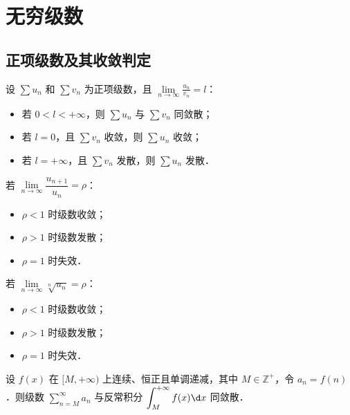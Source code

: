 \documentclass[12pt, a4paper, oneside, UTF8]{ctexbook}
\begin{document}
% 
\else
\fi
\chapter{无穷级数}
\section{正项级数及其收敛判定}
\begin{theorem}[比较判别法的极限形式]\label{thm:lim-comp}
    设 $\sum u_n$ 和 $\sum v_n$ 为正项级数，且 $\lim\limits_{n \to \infty} \frac{u_n}{v_n} = l$：
    \begin{itemize}
        \item 若 $0 < l < +\infty$，则 $\sum u_n$ 与 $\sum v_n$ 同敛散；
        \item 若 $l = 0$，且 $\sum v_n$ 收敛，则 $\sum u_n$ 收敛；
        \item 若 $l = +\infty$，且 $\sum v_n$ 发散，则 $\sum u_n$ 发散．
    \end{itemize}
\end{theorem}

\begin{theorem}
    若 $\lim\limits_{n \to \infty} \dfrac{u_{n+1}}{u_n} = \rho$：
    \begin{itemize}
        \item $\rho < 1$ 时级数收敛；
        \item $\rho > 1$ 时级数发散；
        \item $\rho = 1$ 时失效．
    \end{itemize}
\end{theorem}

\begin{theorem}
    若 $\lim\limits_{n \to \infty} \sqrt[n]{u_n} = \rho$：
    \begin{itemize}
        \item $\rho < 1$ 时级数收敛；
        \item $\rho > 1$ 时级数发散；
        \item $\rho = 1$ 时失效．
    \end{itemize}
\end{theorem}

\begin{theorem}[积分判别法]
    设 $f(x)$ 在 $[M,+\infty)$ 上连续、恒正且单调递减，其中 $M \in \mathbb{Z}^+$，令 $a_n = f(n)$．则级数 $\displaystyle\sum_{n=M}^\infty a_n$ 与反常积分 $\displaystyle\int_M^{+\infty} f(x)\d x$ 同敛散．
\end{theorem}
\end{document}
